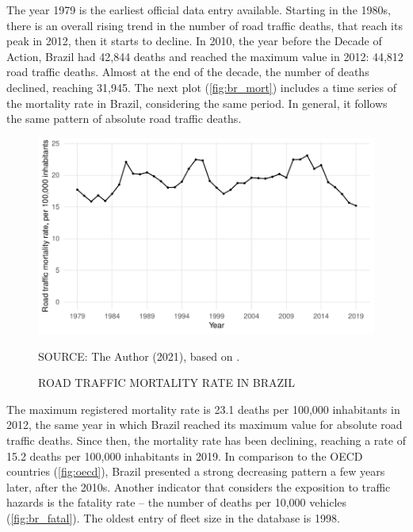 The year 1979 is the earliest official data entry available. Starting in the 1980s, there is an overall rising trend in the number of road traffic deaths, that reach its peak in 2012, then it starts to decline. In 2010, the year before the Decade of Action, Brazil had 42,844 deaths and reached the maximum value in 2012: 44,812 road traffic deaths. Almost at the end of the decade, the number of deaths declined, reaching 31,945. The next plot (\autoref{fig:br_mort}) includes a time series of the mortality rate in Brazil, considering the same period. In general, it follows the same pattern of absolute road traffic deaths.

\begin{figure}[!htbp]
    \centering\footnotesize
    \captionsetup{font=footnotesize}
    \caption{ROAD TRAFFIC MORTALITY RATE IN BRAZIL}
    \includegraphics{fig/brazil_mort.pdf}
    \label{fig:br_mort}
    \par SOURCE: The Author (2021), based on \textcite{MinistryofHealth2020, MinistryofHealth2021}. 
\end{figure}

The maximum registered mortality rate is 23.1 deaths per 100,000 inhabitants in 2012, the same year in which Brazil reached its maximum value for absolute road traffic deaths. Since then, the mortality rate has been declining, reaching a rate of 15.2 deaths per 100,000 inhabitants in 2019. In comparison to the OECD countries (\autoref{fig:oecd}), Brazil presented a strong decreasing pattern a few years later, after the 2010s. Another indicator that considers the exposition to traffic hazards is the fatality rate – the number of deaths per 10,000 vehicles (\autoref{fig:br_fatal}). The oldest entry of fleet size in the \textcite{DENATRAN2020} database is 1998.

